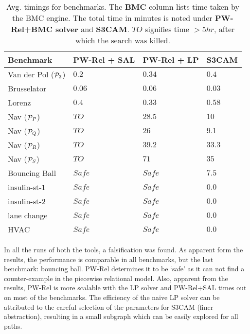 \begin{table}[!htbp]
\centering
\caption{Avg. timings for benchmarks. The \textbf{BMC} column lists
time taken by the BMC engine. The total time in minutes is noted under
    \textbf{PW-Rel+BMC solver} and \textbf{S3CAM}.
$TO$ signifies time $>5hr$, after which the search was killed.}
\label{tab:res-rel}
\begin{tabular}{@{}llll@{}}
\toprule
    Benchmark & PW-Rel + SAL & PW-Rel + LP & S3CAM\\
\midrule
    Van der Pol ($\mathcal{P}_3$)   &$0.2$ & $0.34$ & $0.4$\\
    Brusselator               &$0.06$ & $0.06$ & $0.03$\\
    Lorenz                    &$0.4$ & $0.33$ & $0.58$\\
    Nav ($\mathcal{P}_P$)           &$TO$ & $28.5$  & $10$ \\%
    Nav ($\mathcal{P}_Q$)           &$TO$ & $26$   & $9.1$ \\%
    Nav ($\mathcal{P}_R$)           &$TO$ & $39.2$  & $33.3$\\
    Nav ($\mathcal{P}_S$)           &$TO$ & $71$  & $35$\\
    Bouncing Ball             &$Safe$ & $Safe$  & $7.5$\\

    insulin-st-1             &$Safe$ & $Safe$  & $0.0$\\
    insulin-st-2             &$Safe$ & $Safe$  & $0.0$\\
    lane change              &$Safe$ & $Safe$  & $0.0$\\
    HVAC                     &$Safe$ & $Safe$  & $0.0$\\

\bottomrule
\end{tabular}
\end{table}


In all the runs of both the tools, a falsification was found. As
apparent form the results, the performance is comparable in all
benchmarks, but the last benchmark: bouncing ball. PW-Rel determines
it to be `safe' as it can not find a counter-example in the piecewise
relational model. Also, apparent from the results, PW-Rel is more
scalable with the LP solver and PW-Rel+SAL times out on most of the
benchmarks.  The efficiency of the naive LP solver can be attributed
to the careful selection of the parameters for S3CAM (finer
abstraction), resulting in a small subgraph which can be easily
explored for all paths.

